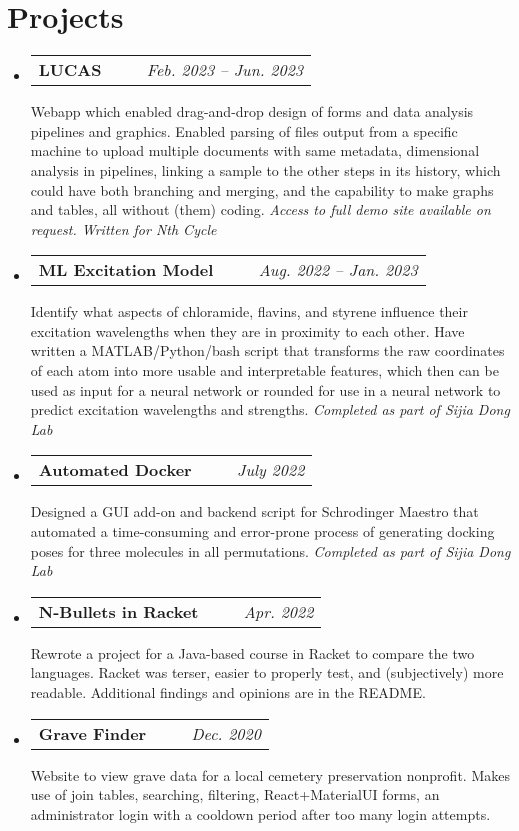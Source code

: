 \documentclass[letterpaper,11pt]{article}
\makeatletter
\newcommand{\resumeSubheading}[5]{
  \vspace{-1pt}\item
    \begin{tabular*}{0.97\textwidth}[t]{c@{\extracolsep{\fill}} r }
      \small\textbf{#1} \headingcap{#3} \ \ \ #2 &  \raggedleft\textit{\small #4} 
    \end{tabular*}
    \small#5
}
\newcommand{\resumeSubHeadingListStart}{\begin{itemize}[leftmargin=*]}
\newcommand{\resumeSubHeadingListEnd}{\end{itemize}}
\makeatother
\begin{document}
  \section{Projects}%
  \resumeSubHeadingListStart \resumeSubheading{LUCAS}{\ghlink{lucas-demo-screenshots}}{ReactTS, MongoDB, Azure, \href{
  https://rjsf-team.github.io/react-jsonschema-form/docs/}{\faIcon{link}RJSF}, \href{
  https://developers.google.com/blockly}{\faIcon{link}Blockly }}{Feb. 2023 --
  Jun. 2023}{Webapp which enabled drag-and-drop design of forms and data analysis pipelines and graphics. Enabled parsing of files output from a specific machine  to upload multiple documents with same metadata, dimensional analysis in pipelines, linking a sample to the other steps in its history, which could have both branching and merging, and the capability to make graphs and tables, all without (them) coding. \textit{Access to full demo site available on request. Written for Nth Cycle}}\resumeSubheading{ML Excitation Model}{}{Python, Maestro, MATLAB, Bash,
  TensorFlow}{Aug. 2022 -- Jan. 2023}{Identify what aspects of chloramide,
  flavins, and styrene influence their excitation wavelengths when they are in
  proximity to each other. Have written a MATLAB/Python/bash script that transforms
  the raw coordinates of each atom into more usable and interpretable features,
  which then can be used as input for a neural network or rounded for use in a
  neural network to predict excitation wavelengths and strengths. \textit{Completed as part of Sijia Dong Lab}}
   \resumeSubheading{Automated
  Docker}{\ghlink{automated\_docking\_script}}{Python, Maestro, Slurm,
  QtPy}{July 2022}{Designed a GUI add-on and backend script for Schrodinger
  Maestro that automated a time-consuming and error-prone process of generating
  docking poses for three molecules in all permutations. \textit{Completed as
  part of Sijia Dong Lab}}
  \resumeSubheading{N-Bullets in Racket}{\ghlink{nbulletsrkt}}{Intermediate Student Language (Racket subset)}{Apr.
  2022} {Rewrote a project for a Java-based course in Racket to compare the two
  languages. Racket was terser, easier to properly test, and (subjectively) more
  readable. Additional findings and opinions are in the README.}
  \resumeSubheading{Grave Finder}{\ghlink{findagravemiddleborough.ml}}{ReactJS,
  PHP, MySQL, Cloudflare, cPanel, SSL}{Dec. 2020}{Website to view grave data for
  a local cemetery preservation nonprofit. Makes use of join tables, searching,
  filtering, React+MaterialUI forms, an administrator login with a cooldown
  period after too many login attempts. } \resumeSubHeadingListEnd
\end{document}
